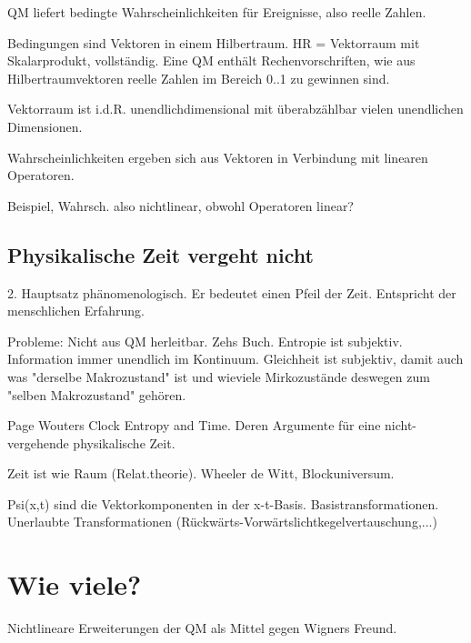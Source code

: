 \documentclass[12pt]{book}
\begin{document}
QM liefert bedingte Wahrscheinlichkeiten für Ereignisse, also reelle Zahlen.

Bedingungen sind Vektoren in einem Hilbertraum. HR = Vektorraum mit Skalarprodukt, vollständig. Eine QM enthält Rechenvorschriften, wie aus Hilbertraumvektoren reelle Zahlen im Bereich 0..1 zu gewinnen sind. 

Vektorraum ist i.d.R. unendlichdimensional mit überabzählbar vielen unendlichen Dimensionen.  

Wahrscheinlichkeiten ergeben sich aus Vektoren in Verbindung mit linearen Operatoren.

Beispiel, Wahrsch. also nichtlinear, obwohl Operatoren linear?
  

\section{Physikalische Zeit vergeht nicht}

2. Hauptsatz phänomenologisch. Er bedeutet einen Pfeil der Zeit. Entspricht der menschlichen Erfahrung. 

Probleme: Nicht aus QM herleitbar. Zehs Buch. Entropie ist subjektiv. Information immer unendlich im Kontinuum. Gleichheit ist subjektiv, damit auch was "derselbe Makrozustand" ist und wieviele Mirkozustände deswegen zum "selben Makrozustand" gehören.

Page Wouters Clock Entropy and Time. Deren Argumente für eine nicht-vergehende physikalische Zeit. 

Zeit ist wie Raum (Relat.theorie). Wheeler de Witt, Blockuniversum. 

Psi(x,t) sind die Vektorkomponenten in der x-t-Basis. Basistransformationen. 
Unerlaubte Transformationen (Rückwärts-Vorwärtslichtkegelvertauschung,...)

\chapter{Wie viele?}

Nichtlineare Erweiterungen der QM als Mittel gegen Wigners Freund.
\end{document}
